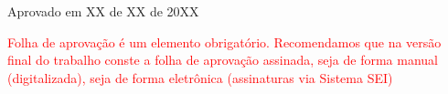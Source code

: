 \documentclass[
	12pt,				%
	openright,			%
	oneside,			%
	a4paper,			%
	english,			%
	french,				%
	spanish,			%
	brazil				%
	]{abntex2UFMT}
\begin{document}

%
% 
%
\begin{folhadeaprovacao}

  \begin{center}
    {\large\imprimirautor}

    \vspace*{\fill}
    \begin{center}
      \large\imprimirtitulo
    \end{center}
    \vspace*{\fill}
    
    \hspace{.45\textwidth}
    \begin{minipage}{.5\textwidth}
        \imprimirpreambulo
    \end{minipage}%
    \vspace*{\fill}
   \end{center}
        
   \begin{center}
   Aprovado em XX de XX de 20XX
   \par\end{center}

      
   \begin{center}
    \noindent\textcolor{red}{Folha de aprovação é um elemento obrigatório. Recomendamos que na versão final do trabalho conste a folha de aprovação assinada, seja de forma manual (digitalizada), seja de forma eletrônica (assinaturas via Sistema SEI)}
  \end{center}
  
\end{folhadeaprovacao}
\end{document}
